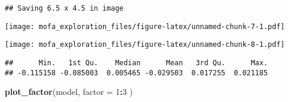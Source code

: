 \documentclass[
]{article}
\newenvironment{Shaded}{\begin{snugshade}}{\end{snugshade}}
\newcommand{\DataTypeTok}[1]{\textcolor[rgb]{0.13,0.29,0.53}{#1}}
\newcommand{\DecValTok}[1]{\textcolor[rgb]{0.00,0.00,0.81}{#1}}
\newcommand{\KeywordTok}[1]{\textcolor[rgb]{0.13,0.29,0.53}{\textbf{#1}}}
\newcommand{\NormalTok}[1]{#1}
\newcommand{\OperatorTok}[1]{\textcolor[rgb]{0.81,0.36,0.00}{\textbf{#1}}}
\newcommand{\StringTok}[1]{\textcolor[rgb]{0.31,0.60,0.02}{#1}}
\begin{document}
\begin{verbatim}
## Saving 6.5 x 4.5 in image
\end{verbatim}

\texttt{[image: mofa\_exploration\_files/figure-latex/unnamed-chunk-7-1.pdf]}

\begin{Shaded}
\end{Shaded}

\texttt{[image: mofa\_exploration\_files/figure-latex/unnamed-chunk-8-1.pdf]}

\begin{Shaded}
\end{Shaded}

\begin{verbatim}
##      Min.   1st Qu.    Median      Mean   3rd Qu.      Max. 
## -0.115158 -0.085003  0.005465 -0.029503  0.017255  0.021185
\end{verbatim}

\begin{Shaded}
\begin{Highlighting}[]
\KeywordTok{plot_factor}\NormalTok{(model, }
  \DataTypeTok{factor =} \DecValTok{1}\OperatorTok{:}\DecValTok{3}
\NormalTok{)}
\end{Highlighting}
\end{Shaded}
\end{document}
